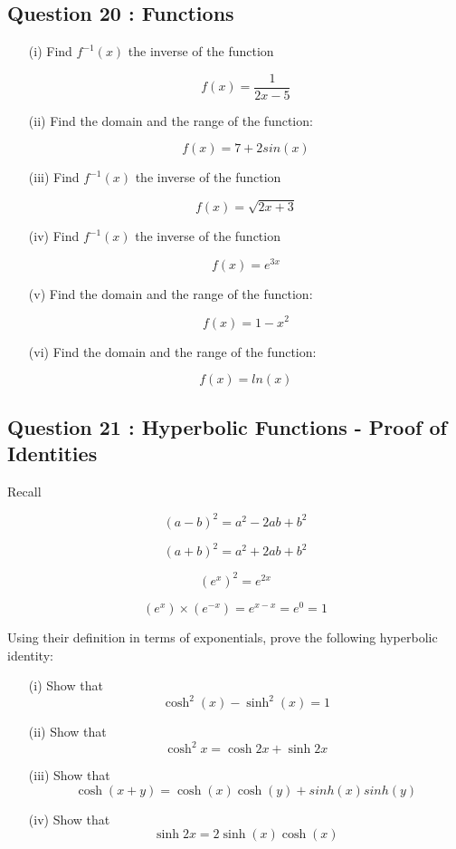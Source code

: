 \documentclass[]{article}
\begin{document}
\subsection*{Question 20 : Functions}
\begin{itemize}
	\item[(i)] Find $f^{-1}(x)$  the inverse of the function
	
	\[f(x) = \frac{1}{2x-5}\]
	
	\item[(ii)] Find the domain and the range of the function:
	
	\[f(x) =  7 + 2 sin(x)\]
	
	\item[(iii)] Find $f^{-1}(x)$  the inverse of the function
	
	\[f(x) = \sqrt{2x + 3} \]
	
	\item[(iv)] Find $f^{-1}(x)$ the inverse of the function
	
	\[f(x) = e^{3x}\]
	
	\item[(v)] Find the domain and the range of the function:
	
	\[ f(x) = 1-x^2 \]
	
	\item[(vi)] Find the domain and the range of the function:
	
	\[f(x) = ln(x)\]
	
\end{itemize}

\subsection*{Question 21 : Hyperbolic Functions - Proof of Identities}
Recall 
\begin{framed}
	\begin{multicols}{2}
		\[ (a-b)^2 = a^2 -2ab +b^2 \]
		
		\[ (a+b)^2 = a^2 + 2ab +b^2 \]
		
		\[ (e^x)^2  = e^{2x} \]
		
		\[  (e^x) \times (e^{-x}) = e^{x-x} =e^0  =1  \]
	\end{multicols}
\end{framed}
\noindent	Using their definition in terms of exponentials, prove the following 
hyperbolic identity:
\begin{itemize}
	\item[(i)] Show that \[ \cosh^2(x) - \sinh^2(x) = 1\]
	\item[(ii)] Show that \[ \cosh^2 x = \cosh2x + \sinh2x\]	
	\item[(iii)] Show that \[ \cosh(x+y) = \cosh(x)\cosh(y) + sinh(x)sinh(y)\]
	\item[(iv)] Show that \[\sinh2x = 2\sinh(x) \cosh(x) \]
	
\end{itemize}
\end{document}
